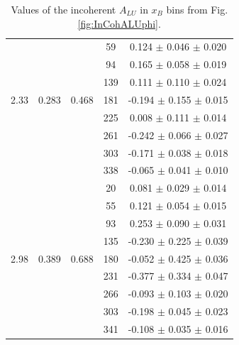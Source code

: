 \documentclass[aps,prc,preprint,superscriptaddress]{revtex4}
\begin{document}
\begin{table}[!h]
\begin{center}
\begin{tabular}{|c|c|c|c|c|}
        &       &       &  59    &  0.124  $\pm$ 0.046   $\pm$  0.020  \\
        &       &       &  94    &  0.165  $\pm$ 0.058   $\pm$  0.019  \\
        &       &       & 139    &  0.111  $\pm$ 0.110   $\pm$  0.024  \\
  2.33  & 0.283 & 0.468 & 181    & -0.194  $\pm$ 0.155   $\pm$  0.015  \\
        &       &       & 225    &  0.008  $\pm$ 0.111   $\pm$  0.014  \\
        &       &       & 261    & -0.242  $\pm$ 0.066   $\pm$  0.027  \\
        &       &       & 303    & -0.171  $\pm$ 0.038   $\pm$  0.018  \\
        &       &       & 338    & -0.065  $\pm$ 0.041   $\pm$  0.010  \\
  \hline
        &       &       &  20    &  0.081  $\pm$ 0.029   $\pm$  0.014  \\
        &       &       &  55    &  0.121  $\pm$ 0.054   $\pm$  0.015  \\
        &       &       &  93    &  0.253  $\pm$ 0.090   $\pm$  0.031  \\
        &       &       & 135    & -0.230  $\pm$ 0.225   $\pm$  0.039  \\
  2.98  & 0.389 & 0.688 & 180    & -0.052  $\pm$ 0.425   $\pm$  0.036  \\
        &       &       & 231    & -0.377  $\pm$ 0.334   $\pm$  0.047  \\
        &       &       & 266    & -0.093  $\pm$ 0.103   $\pm$  0.020  \\
        &       &       & 303    & -0.198  $\pm$ 0.045   $\pm$  0.023  \\
        &       &       & 341    & -0.108  $\pm$ 0.035   $\pm$  0.016  \\
 \hline
 \end{tabular}
 \caption{Values of the incoherent $A_{LU}$ in $x_B$ bins from Fig. \ref{fig:InCohALUphi}.}
 \label{table:InCoh_xB_BSA}
 \end{center}
\end{table}
\end{document}
